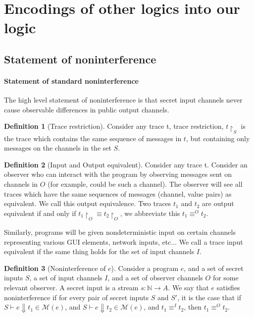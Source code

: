 \documentclass[conference]{IEEEtran}
\newcommand{\code}[1]{\text{\lstinline!#1!}}
\theoremstyle{definition}
\newtheorem{defn}{Definition}[section]
\newcommand{\judge}{\vdash}
\newcommand{\tr}{t}
\begin{document}
\section{Encodings of other logics into our logic}

\subsection{Statement of noninterference}

\paragraph*{Statement of standard noninterference}

The high level statement of noninterference is that secret input
channels never cause observable differences in public output channels.

\begin{defn}[Trace restriction]
  Consider any trace \tr, trace restriction, $\tr\restriction_S$ is
  the trace which contains the same sequence of messages in $\tr$, but
  containing only messages on the channels in the set $S$.
\end{defn}

\begin{defn}[Input and Output equivalent]
  Consider any trace \tr.  Consider an observer who can interact with
  the program by observing messages sent on channels in $O$ (for
  example, \code{netout} could be such a channel).  The observer will
  see all traces which have the same sequences of messages (channel,
  value pairs) as equivalent.  We call this output equivalence.  Two
  traces $\tr_1$ and $\tr_2$ are output equivalent if and only if
  $\tr_1\restriction_O \equiv \tr_2\restriction_O$, we abbreviate this
  $\tr_1 \equiv^O \tr_2$.
  
  Similarly, programs will be given nondeterministic input on certain
  channels representing various GUI elements, network inputs, etc...
  We call a trace input equivalent if the same thing holds for the set
  of input channels $I$.
\end{defn}

\begin{defn}[Noninterference of $e$]
  Consider a program $e$, and a set of secret inputs $S$, a set of
  input channels $I$, and a set of observer channels $O$ for some
  relevant observer.  A secret input is a stream $s : \mathbb{N}
  \rightarrow A$.  We say that $e$ satisfies noninterference if for
  every pair of secret inputs $S$ and $S'$, it is the case that if $S
  \judge e \Downarrow \tr_1 \in \mathcal{M}(e)$, and $S \judge e
  \Downarrow \tr_2 \in \mathcal{M}(e)$, and $\tr_1 \equiv^I \tr_2$,
  then $\tr_1 \equiv^O \tr_2$.
\end{defn}
\end{document}
